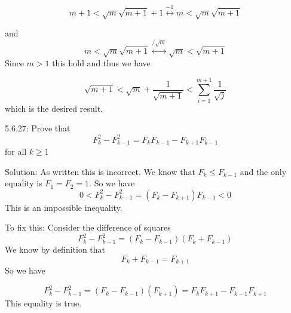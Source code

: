 \documentclass[16 pt]{amsart}
\theoremstyle{definition}
\theoremstyle{remark}
\numberwithin{equation}{subsection}
\begin{document}
\[
m+1 < \sqrt{m}\sqrt{m+1} +1 \overset{-1}{\longleftrightarrow} m<\sqrt{m}\sqrt{m+1}
\]

and
\[
m<\sqrt{m}\sqrt{m+1} \overset{/\sqrt{m}}{\longleftrightarrow} \sqrt{m}<\sqrt{m+1}
\]
Since $m>1$ this hold and thus we have

\[
\sqrt{m+1}<\sqrt{m}+\frac{1}{\sqrt{m+1}} < \sum_{i=1}^{m+1}\frac{1}{\sqrt{j}}
\]
which is the desired result.
\newpage

5.6.27: Prove that 
\[
F_k^2 - F_{k-1}^2= F_k F_{k-1} - F_{k+1}F_{k-1}
\] 
for all $k\geq 1$

\vspace{1in}

Solution: As written this is incorrect.  We know that $F_{k}\leq F_{k-1}$ and the only equality is $F_1=F_2=1$.
So we have
\[
0< F_k^2 - F_{k-1}^2= (F_k  - F_{k+1})F_{k-1} < 0
\]
This is an impossible inequality.

To fix this: Consider the difference of squares
\[
F_k^2 - F_{k-1}^2= (F_k  - F_{k-1})( F_{k}+F_{k-1})
\]
We know by definition that
\[
F_k + F_{k-1} = F_{k+1}
\]
So we have

\[
F_k^2 - F_{k-1}^2= (F_k  - F_{k-1})(F_{k+1}) = F_{k}F_{k+1} - F_{k-1}F_{k+1}
\]
This equality is true.
\end{document}
